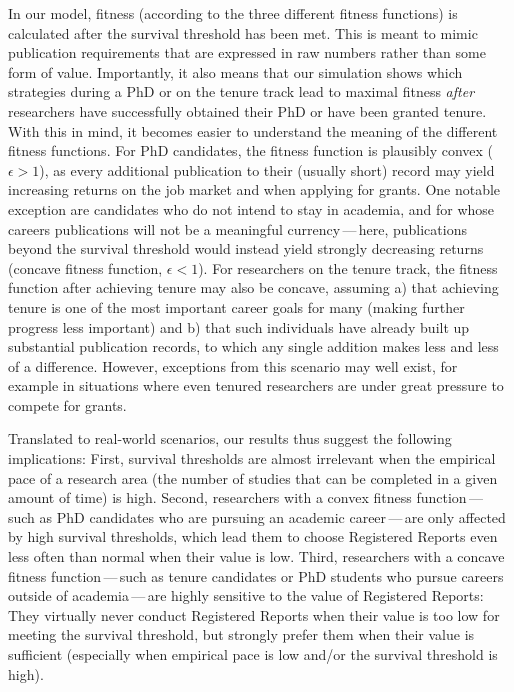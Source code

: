 \documentclass[
  ,man,mask,floatsintext]{apa6}
\begin{document}
In our model, fitness (according to the three different fitness functions) is calculated after the survival threshold has been met.
This is meant to mimic publication requirements that are expressed in raw numbers rather than some form of value.
Importantly, it also means that our simulation shows which strategies during a PhD or on the tenure track lead to maximal fitness \emph{after} researchers have successfully obtained their PhD or have been granted tenure.
With this in mind, it becomes easier to understand the meaning of the different fitness functions.
For PhD candidates, the fitness function is plausibly convex (\(\epsilon > 1\)), as every additional publication to their (usually short) record may yield increasing returns on the job market and when applying for grants.
One notable exception are candidates who do not intend to stay in academia, and for whose careers publications will not be a meaningful currency\(\,\)---\(\,\)here, publications beyond the survival threshold would instead yield strongly decreasing returns (concave fitness function, \(\epsilon < 1\)).
For researchers on the tenure track, the fitness function after achieving tenure may also be concave, assuming a) that achieving tenure is one of the most important career goals for many (making further progress less important) and b) that such individuals have already built up substantial publication records, to which any single addition makes less and less of a difference.
However, exceptions from this scenario may well exist, for example in situations where even tenured researchers are under great pressure to compete for grants.

Translated to real-world scenarios, our results thus suggest the following implications:
First, survival thresholds are almost irrelevant when the empirical pace of a research area (the number of studies that can be completed in a given amount of time) is high.
Second, researchers with a convex fitness function\(\,\)---\(\,\)such as PhD candidates who are pursuing an academic career\(\,\)---\(\,\)are only affected by high survival thresholds, which lead them to choose Registered Reports even less often than normal when their value is low.
Third, researchers with a concave fitness function\(\,\)---\(\,\)such as tenure candidates or PhD students who pursue careers outside of academia\(\,\)---\(\,\)are highly sensitive to the value of Registered Reports:
They virtually never conduct Registered Reports when their value is too low for meeting the survival threshold, but strongly prefer them when their value is sufficient (especially when empirical pace is low and/or the survival threshold is high).
\end{document}

